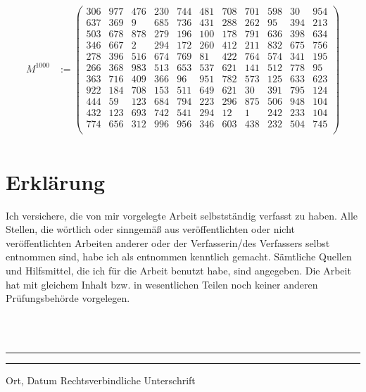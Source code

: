 \documentclass[twoside,11pt]{article}
\begin{document}
\begin{appendices}
\begin{align*}
    M^{1000} &:=
      \begin{pmatrix}
        306 &977 &476 &230 &744 &481 &708 &701 &598 & 30 &954 \\
        637 &369 &  9 &685 &736 &431 &288 &262 & 95 &394 &213 \\
        503 &678 &878 &279 &196 &100 &178 &791 &636 &398 &634 \\
        346 &667 &  2 &294 &172 &260 &412 &211 &832 &675 &756 \\
        278 &396 &516 &674 &769 & 81 &422 &764 &574 &341 &195 \\
        266 &368 &983 &513 &653 &537 &621 &141 &512 &778 & 95 \\
        363 &716 &409 &366 & 96 &951 &782 &573 &125 &633 &623 \\
        922 &184 &708 &153 &511 &649 &621 & 30 &391 &795 &124 \\
        444 & 59 &123 &684 &794 &223 &296 &875 &506 &948 &104 \\
        432 &123 &693 &742 &541 &294 & 12 &  1 &242 &233 &104 \\
        774 &656 &312 &996 &956 &346 &603 &438 &232 &504 &745 \\
      \end{pmatrix} \\
  \end{align*}

\end{appendices}



\newpage
\section*{Erklärung}
Ich versichere, die von mir vorgelegte Arbeit
selbstst\"andig verfasst zu haben.
Alle Stellen, die w\"ortlich oder sinngem\"a{\ss} aus
ver\"offentlichten oder nicht ver\"offentlichten Arbeiten
anderer oder der Verfasserin/des Verfassers selbst
entnommen sind, habe ich als entnommen kenntlich gemacht.
S\"amtliche Quellen und Hilfsmittel, die ich für die Arbeit
benutzt habe, sind angegeben.
Die Arbeit hat mit gleichem Inhalt bzw. in wesentlichen
Teilen noch keiner anderen Pr\"ufungsbeh\"orde vorgelegen.

~\\
~\\
\noindent
\rule{0.35\textwidth}{0.4pt}
\hspace*{3cm}
\rule{0.45\textwidth}{0.4pt}
\newline
Ort, Datum	\hspace*{6.3cm}	Rechtsverbindliche Unterschrift
\end{document}
